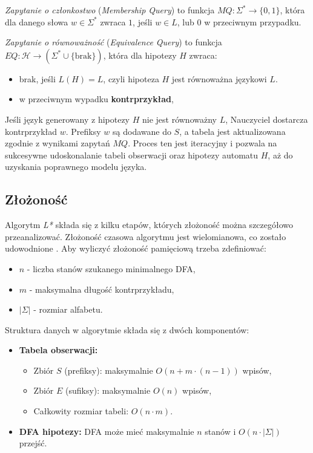 \begin{definition}
    \emph{Zapytanie o członkostwo} (\emph{Membership Query}) to funkcja \( MQ: \Sigma^* \to \{0, 1\} \), która dla danego słowa \( w \in \Sigma^* \) zwraca \( 1 \), jeśli \( w \in L \), lub \( 0 \) w przeciwnym przypadku.
\end{definition}

\begin{definition}
    \emph{Zapytanie o równoważność} (\emph{Equivalence Query}) to funkcja \( EQ: \mathcal{H} \to (\Sigma^* \cup \{\text{brak}\}) \), która dla hipotezy \( H \) zwraca:
    \begin{itemize}
        \item brak, jeśli \( L(H) = L \), czyli hipoteza \( H \) jest równoważna językowi \( L \).
        \item w przeciwnym wypadku \textbf{kontrprzykład},
    \end{itemize}
\end{definition}


Jeśli język generowany z hipotezy \( H \) nie jest równoważny \( L \), Nauczyciel dostarcza kontrprzykład \( w \). Prefiksy \( w \) są dodawane do \( S \), a tabela jest aktualizowana zgodnie z wynikami zapytań \( MQ \). Proces ten jest iteracyjny i pozwala na sukcesywne udoskonalanie tabeli obserwacji oraz hipotezy automatu \( H \), aż do uzyskania poprawnego modelu języka.

\subsection{Złożoność}

Algorytm \textit{L*} składa się z kilku etapów, których złożoność można szczegółowo przeanalizować. Złożoność czasowa algorytmu jest wielomianowa, co zostało udowodnione \cite{L_STAR}. Aby wyliczyć złożoność pamięciową trzeba zdefiniować:
\begin{itemize}
    \item \(n\) - liczba stanów szukanego minimalnego DFA,
    \item \(m\) - maksymalna długość kontrprzykładu,
    \item \(|\Sigma|\) - rozmiar alfabetu.
\end{itemize}

Struktura danych w algorytmie składa się z dwóch komponentów:
\begin{itemize}
    \item \textbf{Tabela obserwacji:}
    \begin{itemize}
        \item Zbiór \(S\) (prefiksy): maksymalnie \(O(n + m \cdot (n - 1))\) wpisów,
        \item Zbiór \(E\) (sufiksy): maksymalnie \(O(n)\) wpisów,
        \item Całkowity rozmiar tabeli: \(O(n \cdot m)\).
    \end{itemize}
    \item \textbf{DFA hipotezy:} DFA może mieć maksymalnie \(n\) stanów i \(O(n \cdot |\Sigma|)\) przejść.
\end{itemize}

